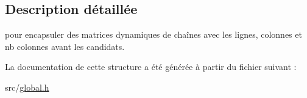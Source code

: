 \subsection{Description détaillée}
pour encapsuler des matrices dynamiques de chaînes avec les lignes, colonnes et nb colonnes avant les candidats. 

La documentation de cette structure a été générée à partir du fichier suivant \+:\begin{DoxyCompactItemize}
\item 
src/\hyperlink{global_8h}{global.\+h}\end{DoxyCompactItemize}

